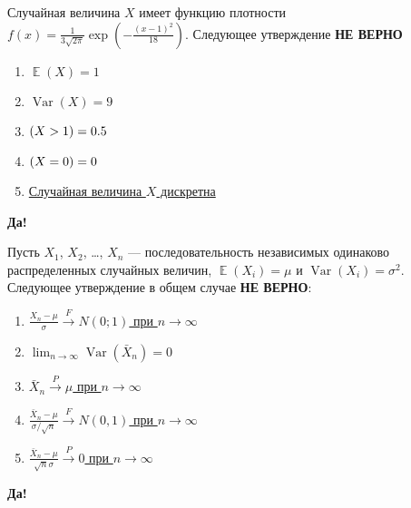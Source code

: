 \documentclass[t]{beamer}
\DeclareMathOperator{\Var}{Var}
\DeclareMathOperator{\E}{\mathbb{E}}
\let\P\relax
\DeclareMathOperator{\P}{\mathbb{P}}
\begin{document}
 \begin{frame} \label{29-Yes} 
\begin{block}{29} 

Случайная величина $X$ имеет функцию плотности $f(x)=\frac{1}{3\sqrt{2\pi}} \exp\left(-\frac{(x-1)^2}{18} \right)$. Следующее утверждение \textbf{НЕ ВЕРНО}
 


 \end{block} 
\begin{enumerate} 
\item[] \hyperlink{29-No}{\beamergotobutton{} $\E(X)=1$}
\item[] \hyperlink{29-No}{\beamergotobutton{} $\Var(X)=9$}
\item[] \hyperlink{29-No}{\beamergotobutton{} $\P(X>1)=0.5$}
\item[] \hyperlink{29-No}{\beamergotobutton{} $\P(X=0)=0$}
\item[] \hyperlink{29-Yes}{\beamergotobutton{} Случайная величина $X$ дискретна}
\end{enumerate} 

 \textbf{Да!} 
 \hyperlink{30}{}\end{frame} 


 \begin{frame} \label{30-Yes} 
\begin{block}{30} 

Пусть $X_1$, $X_2$, \ldots, $X_n$ — последовательность независимых одинаково распределенных случайных величин, $\E(X_i)=\mu$ и $\Var(X_i)=\sigma^2$. Следующее утверждение в общем случае \textbf{НЕ ВЕРНО}:
 


 \end{block} 
\begin{enumerate} 
\item[] \hyperlink{30-Yes}{\beamergotobutton{} $\frac{X_n-\mu}{\sigma} \overset{F}{\to} N(0;1)$ при $n\to\infty$}
\item[] \hyperlink{30-No}{\beamergotobutton{} $\lim_{n\to\infty} \Var(\bar{X}_n)=0$}
\item[] \hyperlink{30-No}{\beamergotobutton{} $\bar{X}_n \overset{P}{\to} \mu$ при $n\to\infty$}
\item[] \hyperlink{30-No}{\beamergotobutton{}$\frac{\bar{X}_n-\mu}{\sigma /\sqrt{n}} \overset{F}{\to } N(0,1) $ при $n\to\infty$}
\item[] \hyperlink{30-No}{\beamergotobutton{} $\frac{\bar{X}_n-\mu}{\sqrt{n} \sigma } \overset{P}{\to } 0 $ при $n\to\infty$}
\end{enumerate} 

 \textbf{Да!} 
 \hyperlink{31}{}\end{frame} 
\end{document}
